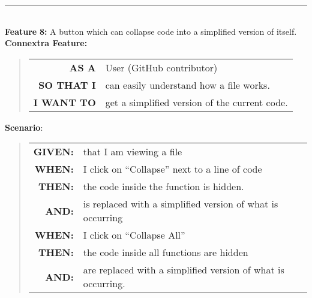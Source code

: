 \documentclass[12pt]{article}
\newcommand{\Feature}[1]{ 
   \noindent \textbf{Feature} #1
}
\newcommand{\CFeature}[4]{
\noindent \textbf{Connextra Feature:}
	\begin{quote}
	\begin{tabular}{rl}
	\textbf{AS A} & #1\\
	\textbf{SO THAT \uppercase{#2}} & #3\\
	\textbf{\uppercase{#2} WANT TO} & #4  
	\end{tabular}
	\end{quote}
}
\newcommand{\GivenSc} {
	\noindent \textbf{GIVEN:}
	}
\newcommand{\WhenSc} {
	\noindent \textbf{WHEN:}
	}
\newcommand{\AndSc} {
	\noindent \textbf{AND:}
	}
\newcommand{\ThenSc} {
	\noindent \textbf{THEN:}
	}
\begin{document}
\begin{framed}
\hrule~\\

\noindent \Feature{\textbf{8:} A button which can collapse code into a simplified version of itself.}\\[0.2cm]

\noindent \CFeature{User (\textsf{GitHub} contributor)}{I}{can easily understand how a file works.}{get a simplified version of the current code.}

\noindent \textbf{Scenario}:
\begin{quote}
\begin{tabular}{rl}
\GivenSc & that I am viewing a file\\
\WhenSc & I click on ``Collapse'' next to a line of code\\
\ThenSc & the code inside the function is hidden.\\
\AndSc & is replaced with a simplified version of what is occurring\\
\WhenSc & I click on ``Collapse All''\\
\ThenSc & the code inside all functions are hidden\\
\AndSc & are replaced with a simplified version of what is occurring.
\end{tabular}
\end{quote}
\end{framed}
\end{document}
